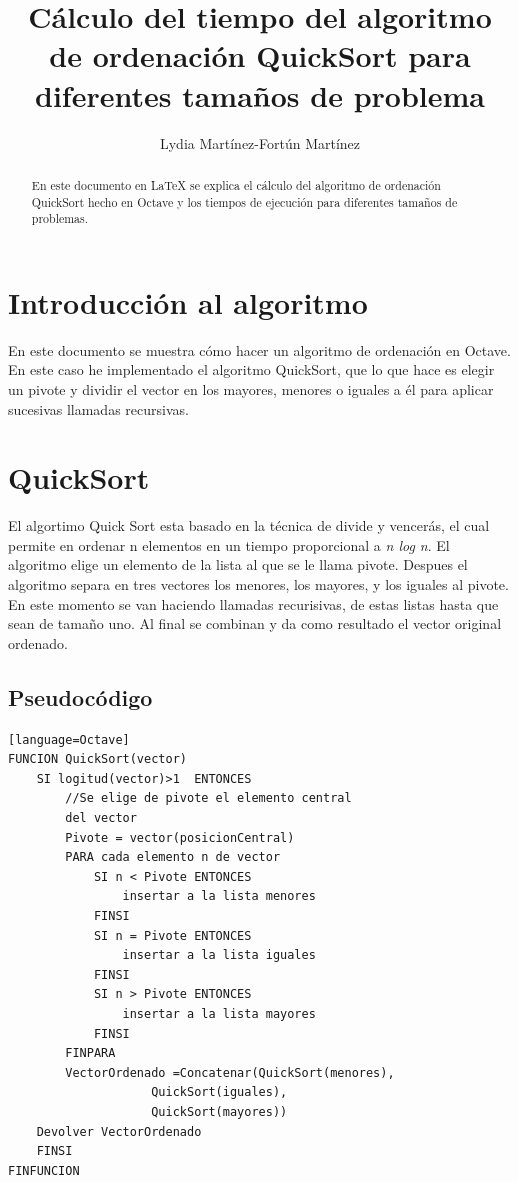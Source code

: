 \documentclass[a4,12pt]{article}
\title{Cálculo del tiempo del algoritmo de ordenación QuickSort para diferentes tamaños de problema}
\author{Lydia Martínez-Fortún Martínez}
\begin{document}
\maketitle



\begin{abstract}
En este documento en \LaTeX{} se explica el cálculo del algoritmo de ordenación QuickSort hecho en Octave y los tiempos de ejecución para diferentes tamaños de problemas.
\end{abstract}
\newpage
\tableofcontents

\newpage

\section{Introducción al algoritmo}

En este documento se muestra cómo hacer un algoritmo de ordenación en Octave. En este caso he implementado el algoritmo QuickSort, que lo que hace es elegir un pivote y dividir el vector en los mayores, menores o iguales a él para aplicar sucesivas llamadas recursivas.



\section{QuickSort}

El algortimo Quick Sort esta basado en la técnica de divide y vencerás, el cual permite en ordenar n elementos en un tiempo proporcional a \emph{n log n}. El algoritmo elige un elemento de la lista al que se le llama pivote. Despues el algoritmo separa en tres vectores los menores, los mayores, y los iguales al pivote. En este momento se van haciendo llamadas recurisivas, de estas listas hasta que sean de tamaño uno. Al final se combinan y da como resultado el vector original ordenado.


\subsection{Pseudocódigo}
\lstset{language=Pascal}
\begin{lstlisting}[frame=single][language=Octave]
FUNCION QuickSort(vector)
	SI logitud(vector)>1  ENTONCES
		//Se elige de pivote el elemento central 
		del vector
		Pivote = vector(posicionCentral)
		PARA cada elemento n de vector
			SI n < Pivote ENTONCES
				insertar a la lista menores
			FINSI
			SI n = Pivote ENTONCES
				insertar a la lista iguales
			FINSI
			SI n > Pivote ENTONCES
				insertar a la lista mayores
			FINSI
		FINPARA
		VectorOrdenado =Concatenar(QuickSort(menores), 
					QuickSort(iguales), 
					QuickSort(mayores))	
	Devolver VectorOrdenado	
	FINSI
FINFUNCION

\end{lstlisting}
\end{document}
